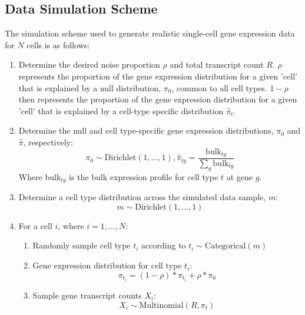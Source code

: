 \subsection{Data Simulation Scheme}
\label{cha:datasim}
The simulation scheme used to generate realistic single-cell gene expression data for $N$ cells is as follows:
\begin{enumerate}
    \item Determine the desired noise proportion $\rho$ and total transcript count $R$. $\rho$ represents the proportion of the gene expression distribution for a given 'cell' that is explained by a null distribution, $\pi_0$, common to all cell types. $1-\rho$ then represents the proportion of the gene expression distribution for a given 'cell' that is explained by a cell-type specific distribution $\hat{\pi}_t$. 
    \item Determine the null and cell type-specific gene expression distributions, $\pi_0$ and $\hat{\pi}$, respectively:
    \begin{equation}
        \pi_0 \sim \text{Dirichlet}(1, \dots, 1), 
        \hat{\pi}_{tg} = \frac{\text{bulk}_{tg}}{\sum_g \text{bulk}_{tg}}
    \end{equation}
    Where bulk$_{tg}$ is the bulk expression profile for cell type $t$ at gene $g$.
    \item Determine a cell type distribution across the simulated data sample, $m$:
    \begin{equation*}
        m \sim \text{Dirichlet}(1,\dots, 1)
    \end{equation*}
    \item For a cell $i$, where $i = 1, \dots, N$:
    \begin{enumerate}
        \item Randomly sample cell type $t_i$ according to $t_i \sim \text{Categorical}(m)$
        \item Gene expression distribution for cell type $t_i$:
        \begin{equation}
            \pi_{t_i} = (1 - \rho) * \hat{\pi}_{t_i} + \rho * \pi_0
        \end{equation}
        \item Sample gene transcript counts $X_i$:
        \begin{equation*}
            X_i \sim \text{Multinomial}(R, \pi_t)
        \end{equation*}
    \end{enumerate}
\end{enumerate}


